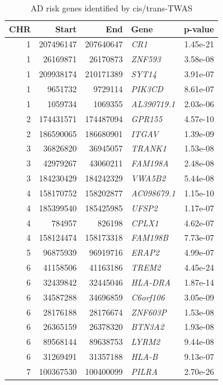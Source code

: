 \begin{longtable}{rrrlr}
\caption{AD risk genes identified by cis/trans-TWAS} \\ 
  \toprule
CHR & Start & End & Gene & p-value \\ 
  \midrule
  1 & 207496147 & 207640647 & \textit{CR1} & 1.45e-21 \\ 
    1 & 26169871 & 26170873 & \textit{ZNF593} & 3.58e-08 \\ 
    1 & 209938174 & 210171389 & \textit{SYT14} & 3.91e-07 \\ 
    1 & 9651732 & 9729114 & \textit{PIK3CD} & 8.61e-07 \\ 
    1 & 1059734 & 1069355 & \textit{AL390719.1} & 2.03e-06 \\ 
    2 & 174431571 & 174487094 & \textit{GPR155} & 4.57e-10 \\ 
    2 & 186590065 & 186680901 & \textit{ITGAV} & 1.39e-09 \\ 
    3 & 36826820 & 36945057 & \textit{TRANK1} & 1.53e-08 \\ 
    3 & 42979267 & 43060211 & \textit{FAM198A} & 2.48e-08 \\ 
    3 & 184230429 & 184242329 & \textit{VWA5B2} & 5.44e-08 \\ 
    4 & 158170752 & 158202877 & \textit{AC098679.1} & 1.15e-10 \\ 
    4 & 185399540 & 185425985 & \textit{UFSP2} & 1.17e-07 \\ 
    4 & 784957 & 826198 & \textit{CPLX1} & 4.62e-07 \\ 
    4 & 158124474 & 158173318 & \textit{FAM198B} & 7.73e-07 \\ 
    5 & 96875939 & 96919716 & \textit{ERAP2} & 4.99e-07 \\ 
    6 & 41158506 & 41163186 & \textit{TREM2} & 4.45e-24 \\ 
    6 & 32439842 & 32445046 & \textit{HLA-DRA} & 1.87e-14 \\ 
    6 & 34587288 & 34696859 & \textit{C6orf106} & 3.05e-09 \\ 
    6 & 28176188 & 28176674 & \textit{ZNF603P} & 1.53e-08 \\ 
    6 & 26365159 & 26378320 & \textit{BTN3A2} & 1.93e-08 \\ 
    6 & 89568144 & 89638753 & \textit{LYRM2} & 9.44e-08 \\ 
    6 & 31269491 & 31357188 & \textit{HLA-B} & 9.13e-07 \\ 
    7 & 100367530 & 100400099 & \textit{PILRA} & 2.70e-26 \\ 

\end{longtable}
